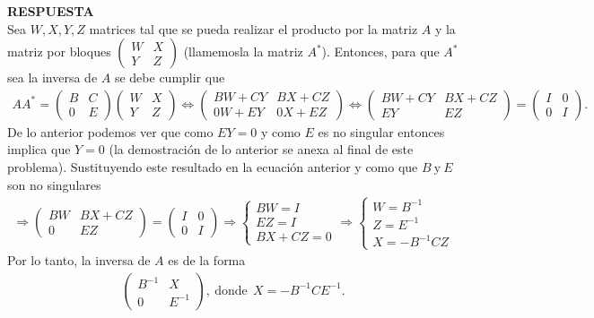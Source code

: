 \documentclass[11pt,letterpaper]{article}
\newcommand{\res}{\textbf{RESPUESTA}\\}
\begin{document}
\begin{enumerate}
\res
Sea $W,X,Y,Z$ matrices tal que se pueda realizar el producto por la matriz $A$ y la matriz por bloques $
\begin{pmatrix}
W & X\\
Y & Z
\end{pmatrix}
$ (llamemosla la matriz $A^*$). Entonces, para que $A^*$ sea la inversa de $A$ se debe cumplir que 
\begin{align*}
AA^{*}=\begin{pmatrix}
B & C \\
0 & E
\end{pmatrix}\begin{pmatrix}
W & X\\
Y & Z
\end{pmatrix}\Leftrightarrow \begin{pmatrix}
BW+CY & BX+CZ\\
0W+EY & 0X+EZ
\end{pmatrix}\Leftrightarrow \begin{pmatrix}
BW+CY & BX+CZ\\
EY & EZ
\end{pmatrix}=\begin{pmatrix}
I&0\\
0&I
\end{pmatrix}.
\end{align*}
De lo anterior podemos ver que como $EY=0$ y como $E$ es no singular entonces implica que $Y=0$ (la demostración de lo anterior se anexa al final de este problema). Sustituyendo este resultado en la ecuación anterior y como que $B\ \text{y} \ E$ son no singulares
\begin{align*}
\Rightarrow \begin{pmatrix}
BW & BX+CZ\\
0 & EZ
\end{pmatrix}=\begin{pmatrix}
I&0\\
0&I
\end{pmatrix}\Rightarrow\left\{\begin{array}{c}
BW=I\\
EZ=I\\
BX+CZ=0
\end{array} \right. \Rightarrow 
\left\{\begin{array}{c}
W=B^{-1}\\
Z=E^{-1}\\
X=-B^{-1}CZ
\end{array} \right.
\end{align*}
Por lo tanto, la inversa de $A$ es de la forma
\begin{align*}
\begin{pmatrix}
B^{-1} & X\\
0& E^{-1}
\end{pmatrix}, \ \text{donde}\ \  X=-B^{-1}CE^{-1}.
\end{align*}


\end{enumerate}
\end{document}
